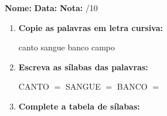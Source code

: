 \begin{exercicio}



\noindent\textbf{Nome:} \underline{\hspace{3.2cm}} \quad \textbf{Data:} \underline{\hspace{1.6cm}} \quad \textbf{Nota:} \underline{\hspace{0.9cm}}/10


\begin{enumerate}

  \item \textbf{Copie as palavras em letra cursiva:}
  \begin{center}
  canto \quad sangue \quad banco \quad campo
  \end{center}
  \begin{center}
  \underline{\hspace{2.4cm}} \quad \underline{\hspace{2.4cm}} \quad \underline{\hspace{2.4cm}} \quad \underline{\hspace{2.4cm}}
  \end{center}

  \item \textbf{Escreva as sílabas das palavras:}
  \begin{center}
  CANTO $=$ \underline{\hspace{1.5cm}} \underline{\hspace{1.5cm}} \quad SANGUE $=$ \underline{\hspace{1.5cm}} \underline{\hspace{1.5cm}} \quad BANCO $=$ \underline{\hspace{1.5cm}} \underline{\hspace{1.5cm}}
  \end{center}

  \item \textbf{Complete a tabela de sílabas:}

\begin{center}
\end{center}


\end{enumerate}
\end{exercicio}
